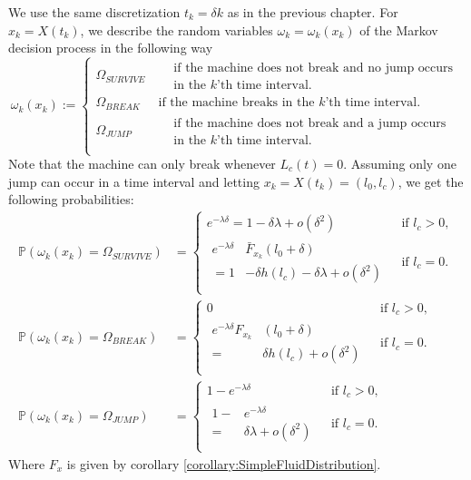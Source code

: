 \documentclass[a4paper]{thesis}
\theoremstyle{definition}
\begin{document}
We use the same discretization $t_k=\delta k$ as in the previous chapter.
For $x_k=X(t_k)$, we describe the random variables $\omega_k=\omega_k(x_k)$ of the Markov decision process in the following way
\[
\omega_k(x_k):=\begin{cases}
\Omega_{SURVIVE}&\ \begin{split}&\text{if the machine does not break and no jump occurs}\\
&\text{in the $k$'th time interval.}\end{split}\\
\Omega_{BREAK}&\ \text{if the machine breaks in the $k$'th time interval.}\\
\Omega_{JUMP}&\ \begin{split}&\text{if the machine does not break and a jump occurs}\\
&\text{in the $k$'th time interval.}\end{split}\\
\end{cases}
\]
Note that the machine can only break whenever $L_c(t)=0$.
Assuming only one jump can occur in a time interval and letting $x_k=X(t_k)=(l_0,l_c)$, we get the following probabilities:
\[
\begin{split}
\mathbb{P}(\omega_k(x_k)=\Omega_{SURVIVE})&=\begin{cases}
e^{-\lambda \delta}=1-\delta\lambda+o(\delta^2)&\text{ if }l_c>0,\\
\begin{split}
e^{-\lambda \delta} & \bar{F}_{x_k}(l_0+\delta)\\
=1&-\delta h(l_c)-\delta\lambda+o(\delta^2)
\end{split}&\text{ if }l_c=0.\\
\end{cases}\\
\mathbb{P}(\omega_k(x_k)=\Omega_{BREAK})&=\begin{cases}
0&\text{ if }l_c>0,\\
\begin{split}
e^{-\lambda \delta}F_{x_k}&(l_0+\delta)\\
=&\delta h(l_c)+o(\delta^2)
\end{split}&\text{ if }l_c=0.\\
\end{cases}\\
\mathbb{P}(\omega_k(x_k)=\Omega_{JUMP})&=\begin{cases}
1-e^{-\lambda \delta} & \text{ if }l_c>0,\\
\begin{split}
1-&e^{-\lambda \delta}\\
=&\delta\lambda+o(\delta^2)
\end{split}&\text{ if }l_c=0.\\
\end{cases}
\end{split}
\]
Where $F_x$ is given by corollary \ref{corollary:SimpleFluidDistribution}.
\end{document}
